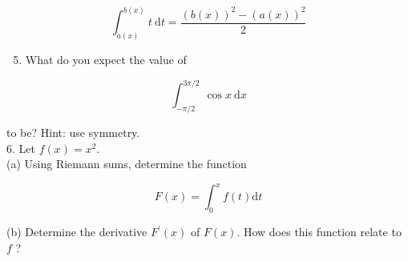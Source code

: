 \documentclass[10pt]{article}
\begin{document}
$$
\int_{a(x)}^{b(x)} t \mathrm{~d} t=\frac{(b(x))^{2}-(a(x))^{2}}{2}
$$

\begin{enumerate}
  \setcounter{enumi}{4}
  \item What do you expect the value of
\end{enumerate}

$$
\int_{-\pi / 2}^{3 \pi / 2} \cos x \mathrm{~d} x
$$

to be? Hint: use symmetry.\\
6. Let $f(x)=x^{2}$.\\
(a) Using Riemann sums, determine the function

$$
F(x)=\int_{0}^{x} f(t) \mathrm{d} t
$$

(b) Determine the derivative $F^{\prime}(x)$ of $F(x)$. How does this function relate to $f$ ?
\end{document}
